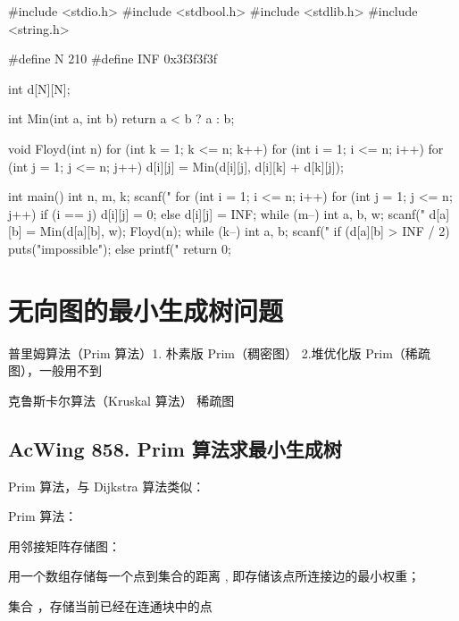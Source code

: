 \begin{mycpptwocol}[Floyd]
    #include <stdio.h>
    #include <stdbool.h>
    #include <stdlib.h>
    #include <string.h>

    #define N 210
    #define INF 0x3f3f3f3f

    int d[N][N];

    int Min(int a, int b) {
        return a < b ? a : b;
    }

    void Floyd(int n) {
        for (int k = 1; k <= n; k++) {
            for (int i = 1; i <= n; i++) {
                for (int j = 1; j <= n; j++) {
                    d[i][j] = Min(d[i][j], d[i][k] + d[k][j]);
                }
            }
        }
    }

    int main() {
        int n, m, k;
        scanf("%
        for (int i = 1; i <= n; i++) {
            for (int j = 1; j <= n; j++) {
                if (i == j) {
                    d[i][j] = 0;
                } else {
                    d[i][j] = INF;
                }
            }
        }
        while (m--) {
            int a, b, w;
            scanf("%
            d[a][b] = Min(d[a][b], w);
        }
        Floyd(n);
        while (k--) {
            int a, b;
            scanf("%
            if (d[a][b] > INF / 2) {
                puts("impossible");
            } else {
                printf("%
            }
        }
        return 0;
    }
\end{mycpptwocol}


\section{无向图的最小生成树问题}

\begin{myenum}
    \item 普里姆算法（Prim 算法）1. 朴素版 Prim（稠密图） 2.堆优化版 Prim（稀疏图），一般用不到
    \item 克鲁斯卡尔算法（Kruskal 算法） 稀疏图
\end{myenum}

\subsection{AcWing 858. Prim 算法求最小生成树}
Prim 算法，与 Dijkstra 算法类似：

Prim 算法：

\begin{myenum}
    \item 用邻接矩阵存储图：
    \item 用一个数组存储每一个点到集合的距离 , 即存储该点所连接边的最小权重；
    \item 集合 ，存储当前已经在连通块中的点
\end{myenum}

